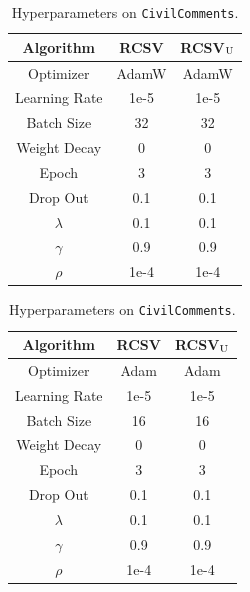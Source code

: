 \begin{table}[htbp]
			\begin{minipage}{0.5\linewidth}
		\caption{Hyperparameters on \texttt{MultiNLI}.}
		\label{tbl:mnli_hyp}
		\centering
		\begin{tabular}{c c c}
			\hline
			Algorithm & RCSV    & RCSV$_{\rm U}$ \\
			\hline
			Optimizer     &  AdamW      & AdamW  \\
			Learning Rate &  1e-5      & 1e-5 \\
			Batch Size    &  32        & 32   \\
			Weight Decay  &  0         & 0     \\
			Epoch         &  3         & 3     \\
			Drop Out      &  0.1       & 0.1   \\
			$\lambda$     &  0.1       & 0.1   \\
			$\gamma$      &  0.9       & 0.9  \\
			$\rho$        &  1e-4      & 1e-4  \\ 
			\hline
		\end{tabular}
	\end{minipage}
	\begin{minipage}{0.5\linewidth}
		\caption{Hyperparameters on \texttt{CivilComments}.}
		\label{tbl:civil_hyp}
		\centering
		\begin{tabular}{c c c}
			\hline
			Algorithm & RCSV    & RCSV$_{\rm U}$ \\
			\hline
			Optimizer     &  Adam      & Adam  \\
			Learning Rate &  1e-5      & 1e-5 \\
			Batch Size    &  16        & 16   \\
			Weight Decay  &  0         & 0     \\
			Epoch         &  3         & 3     \\
			Drop Out      &  0.1       & 0.1   \\
			$\lambda$     &  0.1       & 0.1   \\
			$\gamma$      &  0.9       & 0.9  \\
			$\rho$        &  1e-4      & 1e-4  \\ 
			\hline
		\end{tabular}
	\end{minipage}
\end{table}

